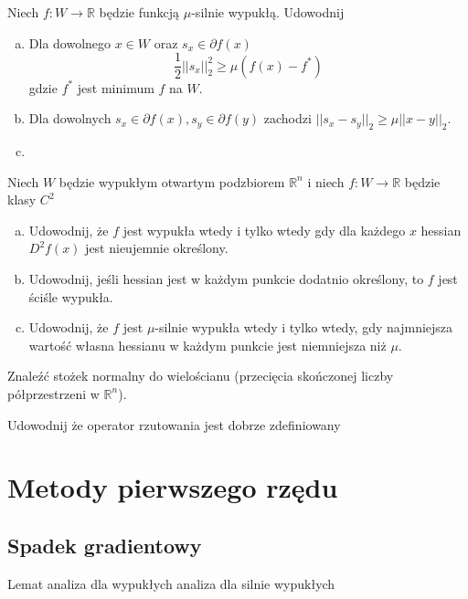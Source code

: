 \documentclass[10pt,a4paper,draft]{report}
\begin{document}
\begin{problem}
Niech $f: W \rightarrow \mathbb{R}$ będzie funkcją $\mu$-silnie wypukłą. Udowodnij
\begin{enumerate}[a)]
\item Dla dowolnego $x \in W$ oraz $s_x \in \partial f(x)$ 
\[
\frac{1}{2} ||s_x||_2^2 \geq \mu (f(x) - f^*)
\]
gdzie $f^*$ jest minimum $f$ na $W$. 
\item Dla dowolnych $s_x \in \partial f(x), s_y \in \partial f(y)$ zachodzi $||s_x - s_y||_2 \geq \mu ||x-y||_2$.
\item 
\end{enumerate}

\end{problem}




\begin{problem}
Niech $W$ będzie wypukłym otwartym podzbiorem $\mathbb{R}^n$ i niech $f : W \rightarrow \mathbb{R}$ będzie klasy $C^2$
\begin{enumerate}[a)]
\item Udowodnij, że $f$ jest wypukła wtedy i tylko wtedy gdy dla każdego $x$ hessian $D^2 f(x)$ jest nieujemnie określony.
\item Udowodnij, jeśli hessian jest w każdym punkcie dodatnio określony, to $f$ jest ściśle wypukła.
\item Udowodnij, że $f$ jest $\mu$-silnie wypukła wtedy i tylko wtedy, gdy najmniejsza wartość własna hessianu w każdym punkcie jest niemniejsza niż $\mu$.
\end{enumerate}
\end{problem}



\begin{problem}
Znaleźć stożek normalny do wielościanu (przecięcia skończonej liczby półprzestrzeni w $\mathbb{R}^n$). 
\end{problem}
\begin{problem}
Udowodnij że operator rzutowania jest dobrze zdefiniowany
\end{problem}




\chapter{Metody pierwszego rzędu}
\section{Spadek gradientowy}
Lemat
analiza dla wypukłych
analiza dla silnie wypukłych
\end{document}
